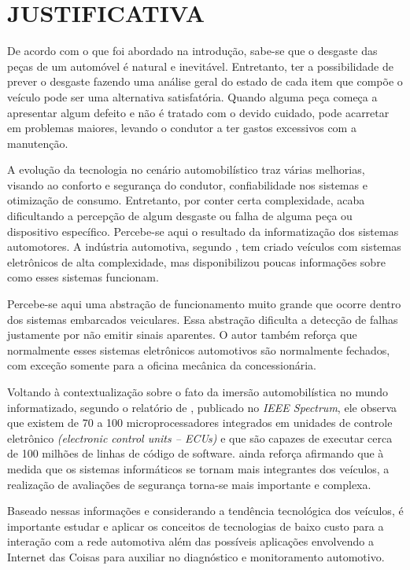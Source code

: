\chapter{JUSTIFICATIVA}\label{CAP2}

De acordo com o que foi abordado na introdução, sabe-se que o desgaste das peças de um automóvel é natural e inevitável. Entretanto, ter a possibilidade de prever o desgaste fazendo uma análise geral do estado de cada item que compõe o veículo pode ser uma alternativa satisfatória. Quando alguma peça começa a apresentar algum defeito e não é tratado com o devido cuidado, pode acarretar em problemas maiores, levando o condutor a ter gastos excessivos com a manutenção.

A evolução da tecnologia no cenário automobilístico traz várias melhorias, visando ao conforto e segurança do condutor, confiabilidade nos sistemas e otimização de consumo. Entretanto, por conter certa complexidade, acaba dificultando a percepção de algum desgaste ou falha de alguma peça ou dispositivo específico. Percebe-se aqui o resultado da informatização dos sistemas automotores. A indústria automotiva, segundo , tem criado veículos com sistemas eletrônicos de alta complexidade, mas disponibilizou poucas informações sobre como esses sistemas funcionam.

Percebe-se aqui uma abstração de funcionamento muito grande que ocorre dentro dos sistemas embarcados veiculares. Essa abstração dificulta a detecção de falhas justamente por não emitir sinais aparentes. O autor também reforça que normalmente esses sistemas eletrônicos automotivos são normalmente fechados, com exceção somente para a oficina mecânica da concessionária.

Voltando à contextualização sobre o fato da imersão automobilística no mundo informatizado, segundo o relatório de , publicado no \textit{IEEE Spectrum}, ele observa que existem de 70 a 100 microprocessadores integrados em unidades de controle eletrônico \textit{(electronic control units – ECUs)} e que são capazes de executar cerca de 100 milhões de linhas de código de software.  ainda reforça afirmando que à medida que os sistemas informáticos se tornam mais integrantes dos veículos, a realização de avaliações de segurança torna-se mais importante e complexa.

Baseado nessas informações e considerando a tendência tecnológica dos veículos, é importante estudar e aplicar os conceitos de tecnologias de baixo custo para a interação com a rede automotiva além das possíveis aplicações envolvendo a Internet das Coisas para auxiliar no diagnóstico e monitoramento automotivo. 